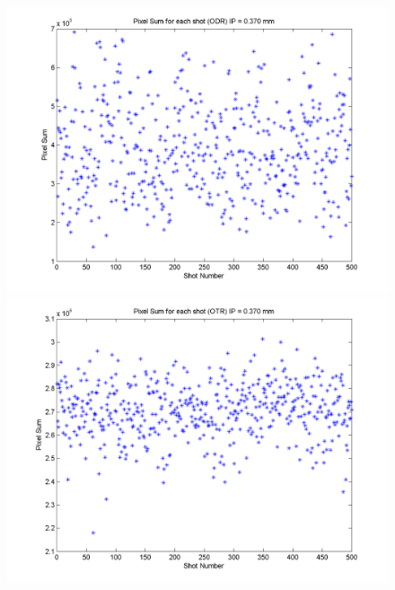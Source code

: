 \documentclass[12pt]{article}
\begin{document}
\begin{figure}
\begin{center}
\includegraphics[scale=0.5]{Figures/PixelSum_ODR_370.PNG}
\includegraphics[scale=0.5]{Figures/PixelSum_OTR_370.PNG}
\caption{}
\end{center}
\end{figure}
\end{document}
